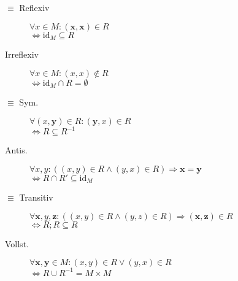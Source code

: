 \documentclass[uniLeipzig]{merkzettel}
\begin{document}
\begin{mzImportant}
  \begin{description}
    \item [$\boldsymbol{\equiv}$ Reflexiv]
          $\forall x \in M: (\mathbf{x}, \mathbf{x}) \in R$ \\
          $\Leftrightarrow \text{id}_M \subseteq R$

    \item [Irreflexiv]
          $\forall x \in M: (x, x) \boldsymbol{\notin} R$ \\
          $\Leftrightarrow \text{id}_M \cap R = \emptyset$

    \item [$\boldsymbol{\equiv}$ Sym.]
          $\forall (x,\mathbf{y}) \in R: (\mathbf{y}, x) \in R$ \\
          $\Leftrightarrow R \subseteq R^{-1}$

    \item [Antis.]
          $\forall x,y: ((x,y) \in R \land (y,x) \in R) \Rightarrow \mathbf{x = y}$ \\
          $\Leftrightarrow R \cap R' \subseteq \text{id}_M$

    \item [$\boldsymbol{\equiv}$ Transitiv]
          $\forall \mathbf{x},y,\mathbf{z}: ((x,y) \in R \land (y,z) \in R) \Rightarrow (\mathbf{x},\mathbf{z}) \in R$ \\
          $\Leftrightarrow R;R \subseteq R$

    \item [Vollst.]
          $\forall \mathbf{x},\mathbf{y} \in M: (x,y) \in R \lor (y,x) \in R$ \\
          $\Leftrightarrow R \cup R^{-1} = M \times M$
  \end{description}
\end{mzImportant}
\end{document}
